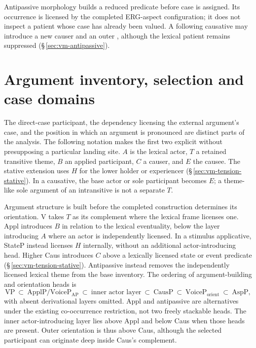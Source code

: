 Antipassive morphology builds a reduced predicate before case is assigned.
Its occurrence is licensed by the completed ERG-aspect configuration; it does
not inspect a patient whose case has already been valued. A following
causative may introduce a new causer and an outer , although the
lexical patient remains suppressed (§\,\ref{sec:vm-antipassive}).

\section{Argument inventory, selection and case domains}
\label{sec:vm-selection-domains}

The direct-case participant, the dependency licensing the external argument's
case, and the position in which an argument is pronounced are distinct parts
of the analysis. The following notation makes the first two explicit without
presupposing a particular landing site. $A$ is the lexical actor, $T$ a
retained transitive theme, $B$ an applied participant, $C$ a causer, and $E$
the causee. The stative extension uses $H$ for the lower holder or experiencer
(§\,\ref{sec:vm-tension-stative}). In a causative, the base actor or sole participant becomes $E$;
a theme-like sole argument of an intransitive is not a separate $T$.

Argument structure is built before the completed construction determines its
orientation. V takes $T$ as its complement where the lexical frame licenses
one. Appl introduces $B$ in relation to the lexical eventuality, below the layer
introducing $A$ where an actor is independently licensed. In a stimulus
applicative, StateP instead licenses $H$ internally, without an additional
actor-introducing head. Higher Caus introduces $C$ above a lexically licensed
state or event predicate (§\,\ref{sec:vm-tension-stative}).
Antipassive instead removes the independently licensed lexical theme from the
base inventory. The ordering of argument-building and orientation heads is
\[
 \mathrm{VP}\ \subset\ \mathrm{ApplP}/\mathrm{VoiceP}_{\mathrm{AP}}
 \ \subset\ \text{inner actor layer}\ \subset\ \mathrm{CausP}\ \subset\
 \mathrm{VoiceP}_{\mathrm{orient}}\ \subset\ \mathrm{AspP},
\]
with absent derivational layers omitted. Appl and antipassive are alternatives
under the existing co-occurrence restriction, not two freely stackable heads.
The inner actor-introducing layer lies above Appl and below Caus when those
heads are present. Outer orientation is thus above Caus, although the selected
participant can originate deep inside Caus's complement.

